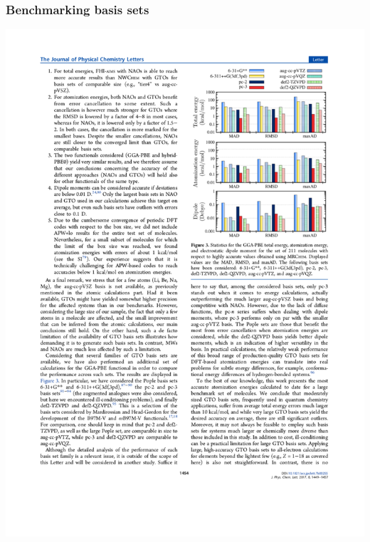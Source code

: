 \begin{frame}
    \frametitle{Benchmarking basis sets}
    \begin{center}
	\includegraphics[scale=0.90, clip, viewport = 300 575 550 780]{figures/elephant_gtos.pdf}
    \end{center}
\end{frame}

